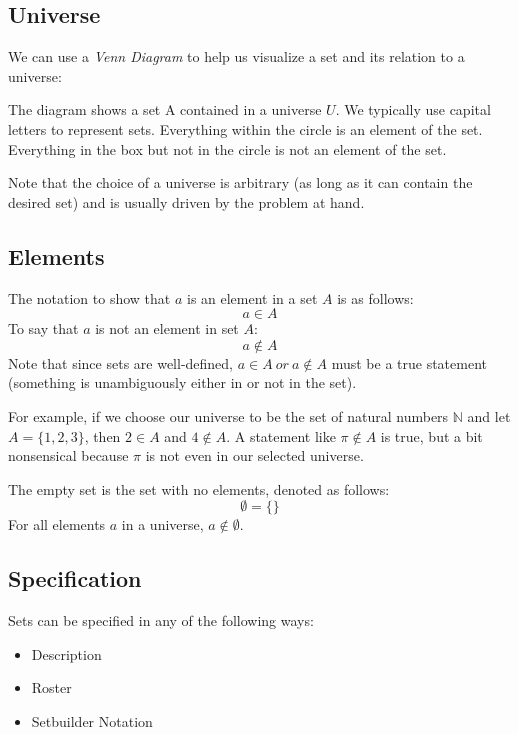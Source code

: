 \documentclass[letterpaper,12pt,fleqn]{article}
\begin{document}
\subsection*{Universe}

We can use a \emph{Venn Diagram} to help us visualize a set and its relation to
a universe:

\begin{center}
\end{center}

The diagram shows a set A contained in a universe $U$. We typically use capital
letters to represent sets. Everything within the circle is an element of the
set. Everything in the box but not in the circle is not an element of the set.

Note that the choice of a universe is arbitrary (as long as it can contain the
desired set) and is usually driven by the problem at hand.

\subsection*{Elements}

The notation to show that $a$ is an element in a set $A$ is as follows:
\[a\in A\]
To say that $a$ is not an element in set $A$:
\[a\notin A\]
Note that since sets are well-defined, $a\in A\ or\ a\notin A$ must be a true
statement (something is unambiguously either in or not in the set).

For example, if we choose our universe to be the set of natural numbers
$\mathbb{N}$ and let $A=\{1, 2, 3\}$, then $2\in A$ and $4\notin A$. A statement
like $\pi\notin A$ is true, but a bit nonsensical because $\pi$ is not even in
our selected universe.

The empty set is the set with no elements, denoted as follows:
\[\emptyset=\{\}\]
For all elements $a$ in a universe, $a\notin\emptyset$.

\subsection*{Specification}

Sets can be specified in any of the following ways:

\begin{itemize}
\item Description
\item Roster
\item Setbuilder Notation
\end{itemize}
\end{document}
